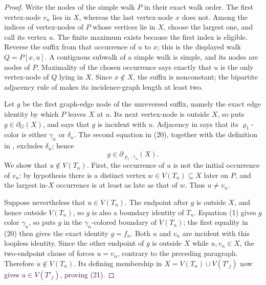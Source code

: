 \begin{proof}
Write the nodes of the simple walk \(P\) in their exact walk order.  The
first vertex-node \(v_n\) lies in \(X\), whereas the last vertex-node
\(x\) does not.  Among the indices of vertex-nodes of \(P\) whose
vertices lie in \(X\), choose the largest one, and call its vertex \(u\).
The finite maximum exists because the first index is eligible.  Reverse
the suffix from that occurrence of \(u\) to \(x\); this is the displayed
walk \(Q=P[x,u]\).  A contiguous subwalk of a simple walk is simple, and
its nodes are nodes of \(P\).  Maximality of the chosen occurrence says
exactly that \(u\) is the only vertex-node of \(Q\) lying in \(X\).
Since \(x\notin X\), the suffix is nonconstant; the bipartite adjacency
rule of  makes its incidence-graph length
at least two.

Let \(g\) be the first graph-edge node of the unreversed suffix, namely
the exact edge identity by which \(P\) leaves \(X\) at \(u\).  Its next
vertex-node is outside \(X\), so  puts
\(g\in\partial_G(X)\), and  says that \(g\) is
incident with \(u\).  Adjacency in
 says that its
\(\varrho_1\)-color is either \(\gamma_n\) or \(\delta_n\).  The second
equation in (20), together with the definition in
, excludes \(\delta_n\); hence
\[
             g\in\partial_{\varrho_1,\gamma_n}(X).             \tag{1}
\]
We show that \(u\notin V(T_n)\).  First, the occurrence of \(u\) is not
the initial occurrence of \(v_n\): by hypothesis there is a distinct
vertex \(w\in V(T_n)\subseteq X\) later on \(P\), and the largest
in-\(X\) occurrence is at least as late as that of \(w\).  Thus
\(u\ne v_n\).

Suppose nevertheless that \(u\in V(T_n)\).  The endpoint after \(g\) is
outside \(X\), and hence outside \(V(T_n)\), so \(g\) is also a boundary
identity of \(T_n\).  Equation (1) gives \(g\) color \(\gamma_n\), so
 puts \(g\) in the \(\gamma_n\)-colored
boundary of \(V(T_n)\); the first equality in (20) then gives the exact
identity \(g=f_n\).  Both \(u\) and \(v_n\) are incident with
this loopless identity.  Since the other endpoint of \(g\) is outside
\(X\) while \(u,v_n\in X\), the two-endpoint clause of
 forces \(u=v_n\), contrary to the preceding
paragraph.  Therefore \(u\notin V(T_n)\).  Its defining membership in
\(X=V(T_n)\cup V(T'_j)\) now gives \(u\in V(T'_j)\), proving (21).


\end{proof}
